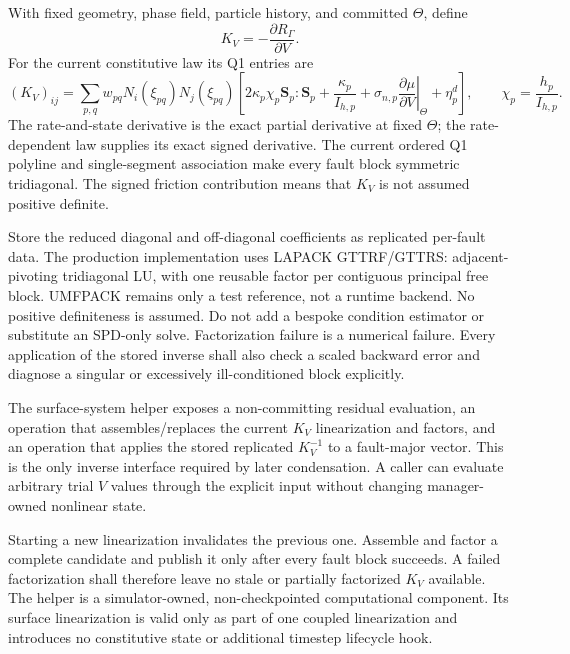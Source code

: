\documentclass[11pt]{article}
\begin{document}
With fixed geometry, phase field, particle history, and committed $\Theta$,
define
\begin{equation}
 K_V=-\frac{\partial R_\Gamma}{\partial V}.
\end{equation}
For the current constitutive law its Q1 entries are
\begin{equation}
 (K_V)_{ij}
 =\sum_{p,q} w_{pq}N_i(\xi_{pq})N_j(\xi_{pq})
 \left[
  2\kappa_p\chi_p\boldsymbol S_p:\boldsymbol S_p
  +\frac{\kappa_p}{I_{h,p}}
  +\sigma_{n,p}
    \left.\frac{\partial\mu}{\partial V}\right|_{\Theta}
  +\eta^d_p
 \right],
 \qquad \chi_p=\frac{h_p}{I_{h,p}}.
\end{equation}
The rate-and-state derivative is the exact partial derivative at fixed
$\Theta$; the rate-dependent law supplies its exact signed derivative.  The
current ordered Q1 polyline and single-segment association make every fault
block symmetric tridiagonal.  The signed friction contribution means that
$K_V$ is not assumed positive definite.

Store the reduced diagonal and off-diagonal coefficients as replicated
per-fault data. The production implementation uses LAPACK GTTRF/GTTRS:
adjacent-pivoting tridiagonal LU, with one reusable factor
per contiguous principal free block. UMFPACK remains only a test reference,
not a runtime backend. No positive definiteness is assumed. Do not add a bespoke condition
estimator or substitute an SPD-only solve. Factorization failure is a numerical failure. Every
application of the stored inverse shall also check a scaled backward error and
diagnose a singular or excessively ill-conditioned block explicitly.

The surface-system helper exposes a non-committing residual evaluation, an
operation that assembles/replaces the current $K_V$ linearization and factors,
and an operation that applies the stored replicated $K_V^{-1}$ to a
fault-major vector.  This is the only inverse interface required by later
condensation.  A caller can evaluate arbitrary trial $V$ values through the
explicit input without changing manager-owned nonlinear state.

Starting a new linearization invalidates the previous one.  Assemble and
factor a complete candidate and publish it only after every fault block
succeeds.  A failed factorization shall therefore leave no stale or partially
factorized $K_V$ available.  The helper is a simulator-owned, non-checkpointed
computational component.  Its surface linearization is valid only as part of
one coupled linearization and introduces no constitutive state or additional
timestep lifecycle hook.
\end{document}

